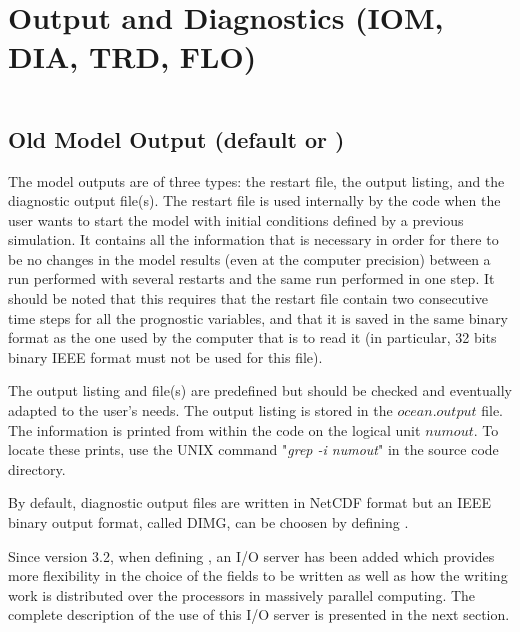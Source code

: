 \documentclass[NEMO_book]{subfiles}
\begin{document}
\chapter{Output and Diagnostics (IOM, DIA, TRD, FLO)}
\label{DIA}
\minitoc

\newpage
$\ $\newline    %

\section{Old Model Output (default or )}
\label{DIA_io_old}

The model outputs are of three types: the restart file, the output listing, 
and the diagnostic output file(s). The restart file is used internally by the code when 
the user wants to start the model with initial conditions defined by a 
previous simulation. It contains all the information that is necessary in 
order for there to be no changes in the model results (even at the computer 
precision) between a run performed with several restarts and the same run 
performed in one step. It should be noted that this requires that the restart file 
contain two consecutive time steps for all the prognostic variables, and 
that it is saved in the same binary format as the one used by the computer 
that is to read it (in particular, 32 bits binary IEEE format must not be used for 
this file). 

The output listing and file(s) are predefined but should be checked 
and eventually adapted to the user's needs. The output listing is stored in 
the $ocean.output$ file. The information is printed from within the code on the 
logical unit $numout$. To locate these prints, use the UNIX command 
"\textit{grep -i numout}" in the source code directory.

By default, diagnostic output files are written in NetCDF format but an IEEE binary output format, called DIMG, can be choosen by defining . 

Since version 3.2, when defining , an I/O server has been added which provides more flexibility in the choice of the fields to be written as well as how the writing work is distributed over the processors in massively parallel computing. The complete description of the use of this I/O server is presented in the next section. 
\end{document}
